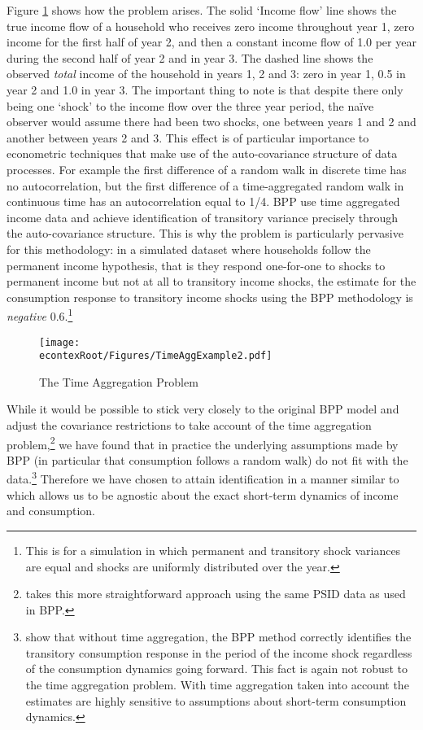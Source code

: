 \documentclass[titlepage]{\econtex}\newcommand{\texname}{ConsumptionHeterogeneity}
\begin{document}
Figure \ref{fig:TimeAgg} shows how the problem arises. The solid `Income flow' line shows the true income flow of a household who receives zero income throughout year 1, zero income for the first half of year 2, and then a constant income flow of 1.0 per year during the second half of year 2 and in year 3. The dashed line shows the observed \textit{total} income of the household in years 1, 2 and 3: zero in year 1, 0.5 in year 2 and 1.0 in year 3. The important thing to note is that despite there only being one `shock' to the income flow over the three year period, the na\"ive observer would assume there had been two shocks, one between years 1 and 2 and another between years 2 and 3. This effect is of particular importance to econometric techniques that make use of the auto-covariance structure of data processes. For example the first difference of a random walk in discrete time has no autocorrelation, but the first difference of a time-aggregated random walk in continuous time has an autocorrelation equal to 1/4. BPP use time aggregated income data and achieve identification of transitory variance precisely through the auto-covariance structure. This is why the problem is particularly pervasive for this methodology: in a simulated dataset where households follow the permanent income hypothesis, that is they respond one-for-one to shocks to permanent income but not at all to transitory income shocks, the estimate for the consumption response to transitory income shocks using the BPP methodology is \textit{negative} 0.6.\footnote{This is for a simulation in which permanent and transitory shock variances are equal and shocks are uniformly distributed over the year.} 
	\begin{figure} 
	\begin{centering}
		\texttt{[image: \\econtexRoot/Figures/TimeAggExample2.pdf]} 
		\caption{The Time Aggregation Problem}
		\label{fig:TimeAgg}
	\end{centering}
\end{figure}

While it would be possible to stick very closely to the original BPP model and adjust the covariance restrictions to take account of the time aggregation problem,\footnote{\cite{crawley_time_2018} takes this more straightforward approach using the same PSID data as used in BPP.} we have found that in practice the underlying assumptions made by BPP (in particular that consumption follows a random walk) do not fit with the data.\footnote{\cite{kaplan_how_2010} show that without time aggregation, the BPP method correctly identifies the transitory consumption response in the period of the income shock regardless of the consumption dynamics going forward. This fact is again not robust to the time aggregation problem. With time aggregation taken into account the estimates are highly sensitive to assumptions about short-term consumption dynamics.} Therefore we have chosen to attain identification in a manner similar to \cite{carroll_nature_1997} which allows us to be agnostic about the exact short-term dynamics of income and consumption.
\end{document}
